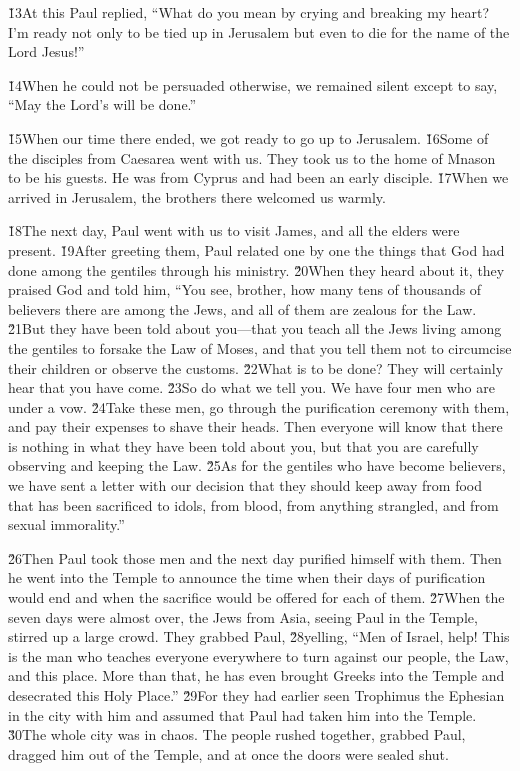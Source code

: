 \v{13}At this Paul replied, ``What do you mean by crying and breaking my heart? I'm ready not only to be tied up in Jerusalem but even to die for the name of the Lord Jesus!''

\v{14}When he could not be persuaded otherwise, we remained silent except to say, ``May the Lord's will be done.''

\v{15}When our time there ended, we got ready to go up to Jerusalem. \v{16}Some of the disciples from Caesarea went with us. They took us to the home of Mnason to be his guests. He was from Cyprus and had been an early disciple. \v{17}When we arrived in Jerusalem, the brothers there welcomed us warmly.

\v{18}The next day, Paul went with us to visit James, and all the elders were present. \v{19}After greeting them, Paul related one by one the things that God had done among the gentiles through his ministry. \v{20}When they heard about it, they praised God and told him, ``You see, brother, how many tens of thousands of believers there are among the Jews, and all of them are zealous for the Law. \v{21}But they have been told about you---that you teach all the Jews living among the gentiles to forsake the Law of Moses, and that you tell them not to circumcise their children or observe the customs. \v{22}What is to be done? They will certainly hear that you have come. \v{23}So do what we tell you. We have four men who are under a vow. \v{24}Take these men, go through the purification ceremony with them, and pay their expenses to shave their heads. Then everyone will know that there is nothing in what they have been told about you, but that you are carefully observing and keeping the Law. \v{25}As for the gentiles who have become believers, we have sent a letter with our decision that they should keep away from food that has been sacrificed to idols, from blood, from anything strangled, and from sexual immorality.''

\v{26}Then Paul took those men and the next day purified himself with them. Then he went into the Temple to announce the time when their days of purification would end and when the sacrifice would be offered for each of them. \v{27}When the seven days were almost over, the Jews from Asia, seeing Paul in the Temple, stirred up a large crowd. They grabbed Paul, \v{28}yelling, ``Men of Israel, help! This is the man who teaches everyone everywhere to turn against our people, the Law, and this place. More than that, he has even brought Greeks into the Temple and desecrated this Holy Place.'' \v{29}For they had earlier seen Trophimus the Ephesian in the city with him and assumed that Paul had taken him into the Temple. \v{30}The whole city was in chaos. The people rushed together, grabbed Paul, dragged him out of the Temple, and at once the doors were sealed shut.

